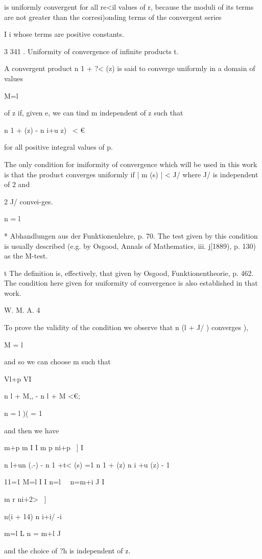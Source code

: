 is uniformly convergent for all re<il values of r, because the moduli
of its terms are not greater than the corresi)onding terms of the
convergent series

I i whose terms are positive constants.

3 341 . Uniformity of convergence of infinite products t.

A convergent product n 1 + ?< (z) is said to converge uniformly in a
domain of values

M=l

of z if, given e, we can tind m independent of z such that

n 1 + (z) - n i+u z) \ < €

for all positive integral values of p.

The only condition for imiformity of convergence which will be used in
this work is that the product converges uniformly if | m (s) | < J/
where J/ is independent of 2 and

2 J/ convei-ges.

n = l

* Abhandlungen aus der Funktionenlehre, p. 70. The test given by this
condition is usually described (e.g. by Osgood, Annals of Mathematics,
iii. j[1889), p. 130) as the M-test.

t The definition is, effectively, that given by Osgood,
Funktionentheorie, p. 462. The condition here given for uuiformity of
convergence is also established in that work.

W. M. A. 4

%
%

To prove the validity of the condition we observe that n (l + J/ )
converges ),

M = l

and so we can choose m such that

Vl+p VI

n l + M,, - n l + M <€;

n = l )( = 1

and then we have

m+p m I I m p ni+p ~] I

n l+un (.-) - n 1 +t< (s) =1 n 1 + (z) n i +u (z) - 1

11=1 M=l I I n=l \ \ n=m+i J I

m r ni+2> ~]

 n(i + 14) n i+i/ -i

m=l L n = m+l J

and the choice of ?h is independent of z.


